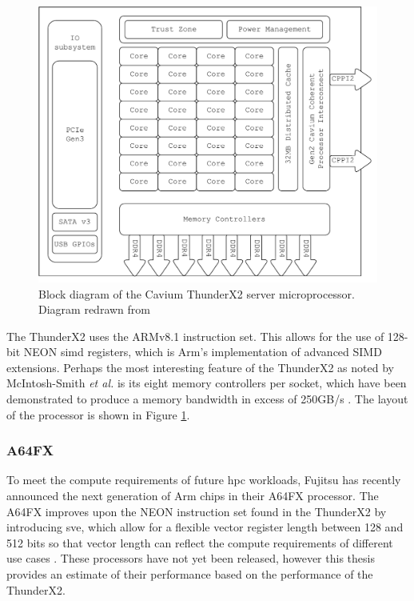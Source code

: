 \documentclass[a4paper,11pt]{report}
\begin{document}
\begin{figure}[H]
\begin{center}
\includegraphics[width=1\textwidth]{img/thunderx2.pdf}
\caption[Block diagram of the Cavium ThunderX2 server microprocessor]{Block diagram of the Cavium ThunderX2 server microprocessor. Diagram redrawn from \cite{thunderprocessor2018brief}}
\label{fig:thunderx2}
\end{center}
\end{figure}
\par
The ThunderX2 uses the ARMv8.1 instruction set. This allows for the use of 128-bit NEON \gls{simd} registers, which is Arm's implementation of advanced SIMD extensions. Perhaps the most interesting feature of the ThunderX2 as noted by McIntosh-Smith \textit{et al.} is its eight memory controllers per socket, which have been demonstrated to produce a memory bandwidth in excess of 250GB/s \cite{mcintosh2018performance}. The layout of the processor is shown in Figure \ref{fig:thunderx2}.

\subsubsection{A64FX}
To meet the compute requirements of future \gls{hpc} workloads, Fujitsu has recently announced the next generation of Arm chips in their A64FX processor. The A64FX improves upon the NEON instruction set found in the ThunderX2 by introducing \gls{sve}, which allow for a flexible vector register length between 128 and 512 bits so that vector length can reflect the compute requirements of different use cases \cite{stephens2017arm, rico2017arm}. These processors have not yet been released, however this thesis provides an estimate of their performance based on the performance of the ThunderX2.
\end{document}
